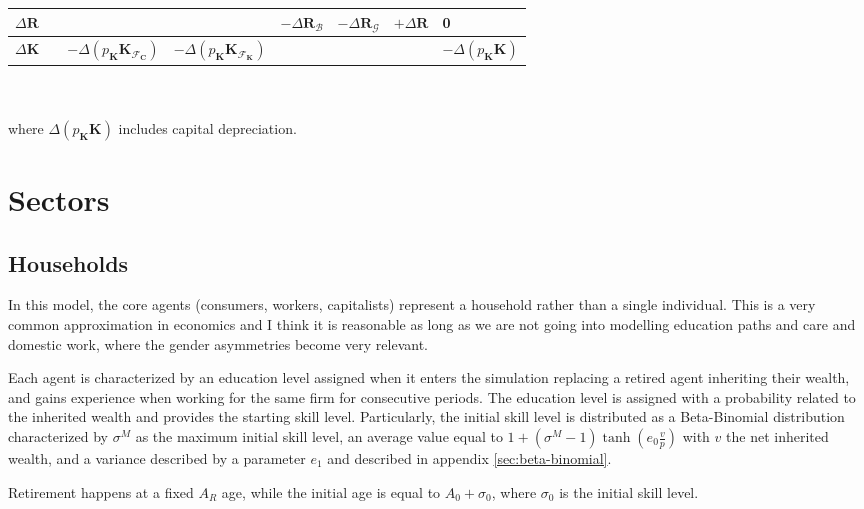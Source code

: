\documentclass[a4paper, headings=standardclasses]{scrartcl}
\begin{document}
{\begin{tabularx}{\textwidth}{@{} Y|cccccc|l @{}}
        $\Delta\mathbf{R}$     &                                          &                                                            &                                                                        & $-\Delta\mathbf{R}_\mathcal{B}$        & $-\Delta\mathbf{R}_\mathcal{G}$          & $+\Delta\mathbf{R}$                    & 0                                 \\
        \midrule
        $\Delta\mathbf{K}$     &                                          & $-\Delta(p_\mathbf{K}\mathbf{K}_{\mathcal{F}_\mathbf{C}})$ & $-\Delta(p_\mathbf{K}\mathbf{K}_{\mathcal{F}_\mathbf{K}})$             &                                        &                                          &                                        & $-\Delta(p_\mathbf{K}\mathbf{K})$ \\
        \bottomrule
    \end{tabularx}
}\\ \\
where $\Delta(p_\mathbf{K}\mathbf{K})$ includes capital depreciation.

\section{Sectors}
\subsection{Households}
In this model, the core agents (consumers, workers, capitalists) represent a household rather than a single individual. This is a very common approximation in economics and I think it is reasonable as long as we are not going into modelling education paths and care and domestic work, where the gender asymmetries become very relevant.

Each agent is characterized by an education level assigned when it enters the simulation replacing a retired agent inheriting their wealth, and gains experience when working for the same firm for consecutive periods.
The education level is assigned with a probability related to the inherited wealth and provides the starting skill level.
Particularly, the initial skill level is distributed as a Beta-Binomial distribution characterized by $\sigma^M$ as the maximum initial skill level, an average value equal to $1+(\sigma^M-1)\tanh(e_0 \frac{v}{p})$ with $v$ the net inherited wealth, and a variance described by a parameter $e_1$ and described in appendix \ref{sec:beta-binomial}.

Retirement happens at a fixed $A_R$ age, while the initial age is equal to $A_0 + \sigma_0$, where $\sigma_0$ is the initial skill level.
\end{document}
